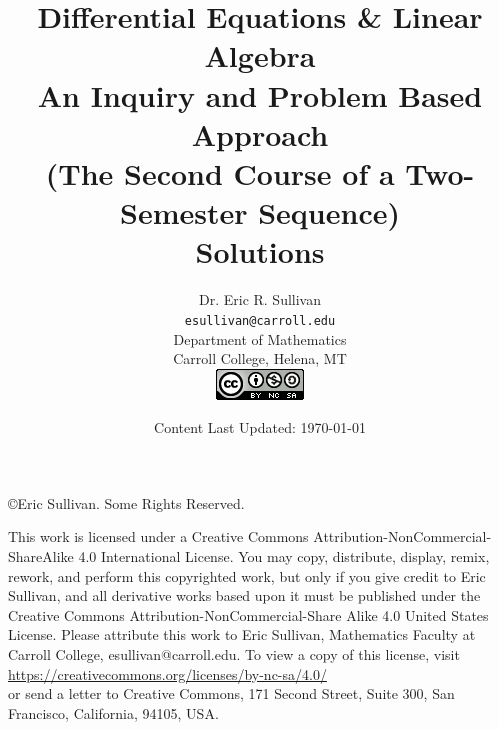 \documentclass[12pt,oneside]{book}
\title{Differential Equations \& Linear Algebra \\ An Inquiry and Problem Based Approach
    \\ {\small (The Second Course of a Two-Semester Sequence)}
    \ifnum\ShowSoln=1 {\color{red} \\ {\bf Solutions}} \fi}
\date{Content Last Updated: \today}
\author{Dr. Eric R. Sullivan \\ \texttt{esullivan@carroll.edu}\\ Department of
Mathematics \\
Carroll College, Helena, MT \\
\includegraphics{CreativeCommons.png} \\\vspace{3in}
}
\theoremstyle{definition}
\begin{document}
\maketitle
\newpage
\noindent \copyright Eric Sullivan. Some Rights Reserved.

\vspace{0.2in}
This work is licensed under a Creative Commons Attribution-NonCommercial-ShareAlike 4.0
International License.
You may copy, distribute, display, remix, rework, and perform this copyrighted work, but only if
you give credit to Eric Sullivan, and all derivative works based upon it must be published
under the Creative Commons Attribution-NonCommercial-Share Alike 4.0 United States License. Please
attribute this work to Eric Sullivan, Mathematics Faculty at Carroll College,
esullivan@carroll.edu. To view a copy of this license, visit\\
\href{https://creativecommons.org/licenses/by-nc-sa/4.0/}{https://creativecommons.org/licenses/by-nc-sa/4.0/}\\
or send a letter to Creative Commons, 171 Second Street, Suite 300, San Francisco,
California, 94105, USA.
\tableofcontents
















\begin{appendices}
    
    
\end{appendices}
\end{document}

